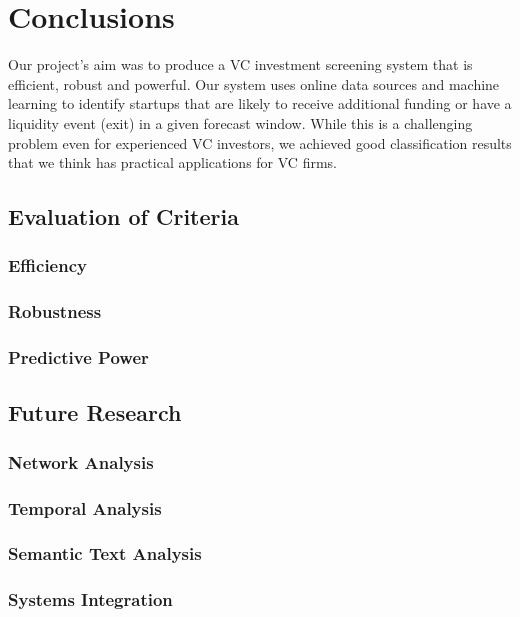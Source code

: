 \documentclass[../thesis/thesis.tex]{subfiles}
\begin{document}
 \chapter{Conclusions}
 \label{chap:conclusions}

Our project’s aim was to produce a VC investment screening system that is efficient, robust and powerful. Our system uses online data sources and machine learning to identify startups that are likely to receive additional funding or have a liquidity event (exit) in a given forecast window. While this is a challenging problem even for experienced VC investors, we achieved good classification results that we think has practical applications for VC firms.

\section{Evaluation of Criteria}

\subsection{Efficiency}


\subsection{Robustness}


\subsection{Predictive Power}


\section{Future Research}

\subsection{Network Analysis}


\subsection{Temporal Analysis}


\subsection{Semantic Text Analysis}


\subsection{Systems Integration}
\end{document}
